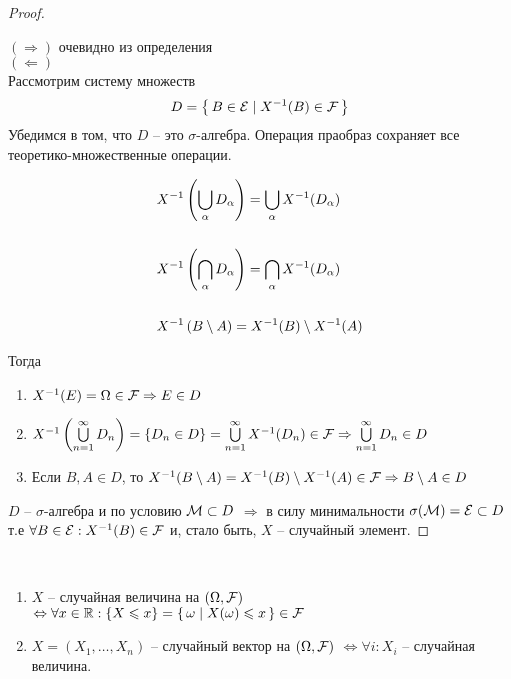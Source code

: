 \begin{proof}~

  $(\Rightarrow)$ очевидно из определения\\

  $(\Leftarrow)$ \\
  Рассмотрим систему множеств
  \begin{align*}
    D = \left\{ \, B \in \mathcal{E} \mid X^{-1}(B) \in \mathcal{F} \, \right\}
  \end{align*}
  Убедимся в том, что $D$ -- это $\sigma$-алгебра. 
  Операция праобраз сохраняет все теоретико-множественные операции.

  \begin{align*}
    &X^{-1}\left( \bigcup_{\alpha} D_{\alpha} \right) = \bigcup_{\alpha} X^{-1} (D_{\alpha})\\\\
    &X^{-1}\left( \bigcap_{\alpha} D_{\alpha} \right) = \bigcap_{\alpha} X^{-1} (D_{\alpha})\\\\
    &X^{-1}\left( B \setminus A \right) = X^{-1} (B) \setminus X^{-1} (A)
  \end{align*}

  Тогда
  \begin{enumerate}
    \item 
      $X^{-1}(E) = \Omega \in \mathcal{F} \Rightarrow E \in D$

    \item  
      $X^{-1}\left( \bigcup\limits_{n = 1}^{\infty} D_n \right) = \{ D_n \in D \} = 
      \bigcup\limits_{n = 1}^{\infty} X^{-1}(D_n) \in \mathcal{F} 
      \Rightarrow \bigcup\limits_{n = 1}^{\infty} D_n \in D$

    \item
      Если $B, A \in D$, то
      $X^{-1}(B \setminus A) = X^{-1}(B) \setminus X^{-1}(A) \in \mathcal{F} 
      \Rightarrow B \setminus A \in D$
  \end{enumerate}

  $D$ -- $\sigma$-алгебра и по условию $\mathcal{M} \subset D$
  $\Rightarrow$ в силу минимальности $\sigma(\mathcal{M}) = \mathcal{E} \subset D$\\
  т.е $\forall  B \in \mathcal{E} : X^{-1}(B) \in \mathcal{F}$
  и, стало быть, $X$ -- случайный элемент.
\end{proof}

\begin{corollary}~

  \begin{enumerate}
    \item 
      $X$ -- случайная величина на $(\Omega, \mathcal{F})$
      $\Leftrightarrow \forall x \in \mathbb{R} :
       \{ X \leqslant x \} = 
      \left\{ \, \omega \mid X(\omega) \leqslant x \, \right\} \in \mathcal{F}$

    \item $X = (X_1, \ldots, X_n)$ -- случайный вектор на $(\Omega, \mathcal{F})$
          $\Leftrightarrow \forall i : X_i$ -- случайная величина.
  \end{enumerate}

\end{corollary}

